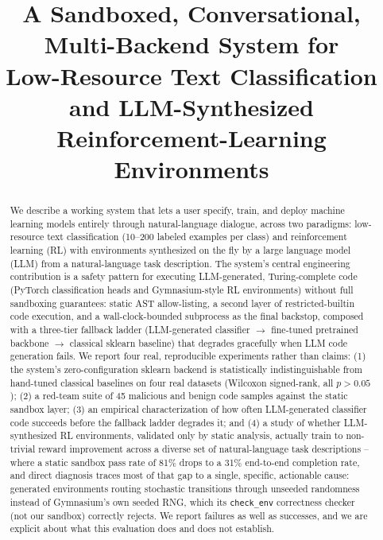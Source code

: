 \documentclass[10pt,twocolumn]{article}
\title{\vspace{-1em}A Sandboxed, Conversational, Multi-Backend System for\\
Low-Resource Text Classification and LLM-Synthesized\\
Reinforcement-Learning Environments\vspace{-0.5em}}
\author{}
\date{}
\begin{document}

\begin{abstract}
We describe a working system that lets a user specify, train, and deploy machine
learning models entirely through natural-language dialogue, across two paradigms:
low-resource text classification (10--200 labeled examples per class) and
reinforcement learning (RL) with environments synthesized on the fly by a large
language model (LLM) from a natural-language task description. The system's
central engineering contribution is a safety pattern for executing
LLM-generated, Turing-complete code (PyTorch classification heads and
Gymnasium-style RL environments) without full sandboxing guarantees: static
AST allow-listing, a second layer of restricted-builtin code execution, and a
wall-clock-bounded subprocess as the final backstop, composed with a
three-tier fallback ladder (LLM-generated classifier
$\to$ fine-tuned pretrained backbone $\to$ classical sklearn baseline) that
degrades gracefully when LLM code generation fails. We report four real,
reproducible experiments rather than claims: (1) the system's
zero-configuration sklearn backend is statistically indistinguishable from
hand-tuned classical baselines on four real datasets (Wilcoxon signed-rank,
all $p>0.05$); (2) a red-team suite of 45 malicious and benign code samples
against the static sandbox layer; (3) an empirical characterization of how
often LLM-generated classifier code succeeds before the fallback ladder
degrades it; and (4) a study of whether LLM-synthesized RL environments,
validated only by static analysis, actually train to non-trivial reward
improvement across a diverse set of natural-language task descriptions --
where a static sandbox pass rate of 81\% drops to a 31\% end-to-end
completion rate, and direct diagnosis traces most of that gap to a single,
specific, actionable cause: generated environments routing stochastic
transitions through unseeded randomness instead of Gymnasium's own seeded
RNG, which its \texttt{check\_env} correctness checker (not our sandbox)
correctly rejects. We report failures as well as successes, and we are
explicit about what this evaluation does and does not establish.
\end{abstract}
\end{document}
